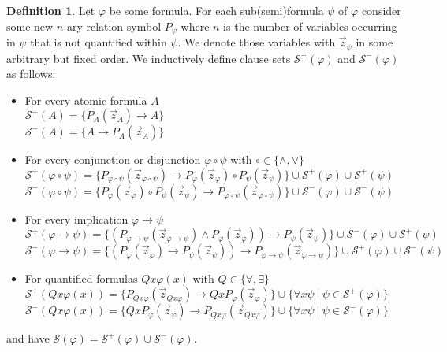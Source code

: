 \documentclass[a4paper,12pt]{report}
\theoremstyle{definition}
\theoremstyle{definition}
\theoremstyle{definition}
\theoremstyle{definition}
\theoremstyle{definition}
\newtheorem{definition}[theorem]{Definition}
\theoremstyle{definition}
\theoremstyle{definition}
\begin{document}
	\begin{definition}
		Let $\varphi$ be some formula. For each sub(semi)formula $\psi$ of $\varphi$ consider some new $n$-ary relation symbol $P_\psi$ where $n$ is the number of variables occurring in $\psi$ that is not quantified within $\psi$. We denote those variables with $\vec z_\psi$ in some arbitrary but fixed order. We inductively define clause sets $\mathcal S^+(\varphi)$ and $\mathcal S^-(\varphi)$ as follows:
		\begin{itemize}
			\item For every atomic formula $A$\\$\mathcal S^+(A) = \{P_A(\vec z_A)\to A\}$\\$\mathcal S^-(A) = \{A\to P_A(\vec z_A)\}$
			\item For every conjunction or disjunction $\varphi\circ\psi$ with $\circ\in\{\wedge,\vee\}$\\$\mathcal S^+(\varphi\circ\psi) = \{P_{\varphi\circ\psi}(\vec z_{\varphi\circ\psi})\to P_{\varphi}(\vec z_\varphi)\circ P_{\psi}(\vec z_\psi)\}\cup \mathcal S^+(\varphi)\cup \mathcal S^+(\psi)$\\$\mathcal S^-(\varphi\circ\psi) =\{P_{\varphi}(\vec z_\varphi)\circ P_{\psi}(\vec z_\psi)\to P_{\varphi\circ\psi}(\vec z_{\varphi\circ\psi})\}\cup \mathcal S^-(\varphi)\cup \mathcal S^-(\psi)$
			\item For every implication $\varphi \to\psi$\\$\mathcal S^+(\varphi\to\psi) = \{(P_{\varphi\to\psi}(\vec z_{\varphi\to\psi})\wedge P_{\varphi}(\vec z_\varphi))\to P_{\psi}(\vec z_\psi)\}\cup \mathcal S^-(\varphi)\cup \mathcal S^+(\psi)$\\$\mathcal S^-(\varphi\to\psi)  = \{(P_{\varphi}(\vec z_\varphi)\to P_{\psi}(\vec z_\psi))\to P_{\varphi\to\psi}(\vec z_{\varphi\to\psi})\}\cup \mathcal S^+(\varphi)\cup \mathcal S^-(\psi)$
			\item For quantified formulas $Qx\varphi(x)$ with $Q\in \{\forall,\exists\}$\\$\mathcal S^+(Qx\varphi(x)) = \{P_{Qx\varphi}(\vec z_{Qx\varphi})\to QxP_{\varphi}(\vec z_{\varphi})\}\cup \{\forall x\psi\:|\:\psi\in\mathcal S^+(\varphi)\}$\\$\mathcal S^-(Qx\varphi(x))  = \{QxP_{\varphi}(\vec z_{\varphi})\to P_{Qx\varphi}(\vec z_{Qx\varphi})\}\cup \{\forall x\psi\:|\:\psi\in\mathcal S^-(\varphi)\}$
		\end{itemize}
		and have $\mathcal S(\varphi) = \mathcal S^+(\varphi)\cup\mathcal S^-(\varphi)$.
	\end{definition}
	
\end{document}

